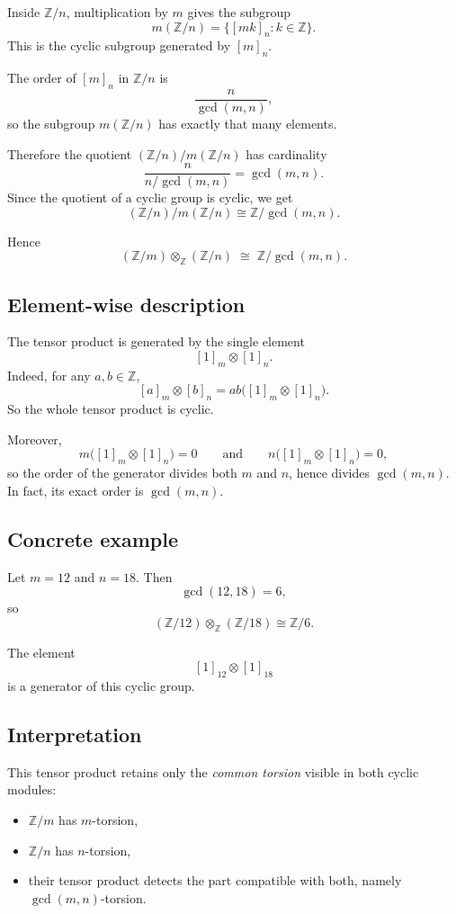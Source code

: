 \documentclass[12pt,a4paper]{article}
\theoremstyle{plain}
\theoremstyle{definition}      %
\begin{document}
	Inside \(\mathbb Z/n\), multiplication by \(m\) gives the subgroup
	\[
	m(\mathbb Z/n)
	=
	\{[mk]_n : k\in\mathbb Z\}.
	\]
	This is the cyclic subgroup generated by \([m]_n\).
	
	The order of \([m]_n\) in \(\mathbb Z/n\) is
	\[
	\frac{n}{\gcd(m,n)},
	\]
	so the subgroup \(m(\mathbb Z/n)\) has exactly that many elements.
	
	Therefore the quotient \((\mathbb Z/n)/m(\mathbb Z/n)\) has cardinality
	\[
	\frac{n}{n/\gcd(m,n)}=\gcd(m,n).
	\]
	Since the quotient of a cyclic group is cyclic, we get
	\[
	(\mathbb Z/n)/m(\mathbb Z/n)\cong \mathbb Z/\gcd(m,n).
	\]
	
	Hence
	\[
	(\mathbb Z/m)\otimes_{\mathbb Z}(\mathbb Z/n)
	\;\cong\;
	\mathbb Z/\gcd(m,n).
	\]
	
	\subsection{Element-wise description}
	
	The tensor product is generated by the single element
	\[
	[1]_m\otimes [1]_n.
	\]
	Indeed, for any \(a,b\in\mathbb Z\),
	\[
	[a]_m\otimes [b]_n
	=
	ab\bigl([1]_m\otimes[1]_n\bigr).
	\]
	So the whole tensor product is cyclic.
	
	Moreover,
	\[
	m\bigl([1]_m\otimes[1]_n\bigr)=0
	\qquad\text{and}\qquad
	n\bigl([1]_m\otimes[1]_n\bigr)=0,
	\]
	so the order of the generator divides both \(m\) and \(n\), hence divides \(\gcd(m,n)\). In fact, its exact order is \(\gcd(m,n)\).
	
	\subsection{Concrete example}
	
	Let \(m=12\) and \(n=18\). Then
	\[
	\gcd(12,18)=6,
	\]
	so
	\[
	(\mathbb Z/12)\otimes_{\mathbb Z}(\mathbb Z/18)\cong \mathbb Z/6.
	\]
	
	The element
	\[
	[1]_{12}\otimes [1]_{18}
	\]
	is a generator of this cyclic group.
	
	\subsection{Interpretation}
	
	This tensor product retains only the \emph{common torsion} visible in both cyclic modules:
	\begin{itemize}
		\item \(\mathbb Z/m\) has \(m\)-torsion,
		\item \(\mathbb Z/n\) has \(n\)-torsion,
		\item their tensor product detects the part compatible with both, namely \(\gcd(m,n)\)-torsion.
	\end{itemize}
	
\end{document}
